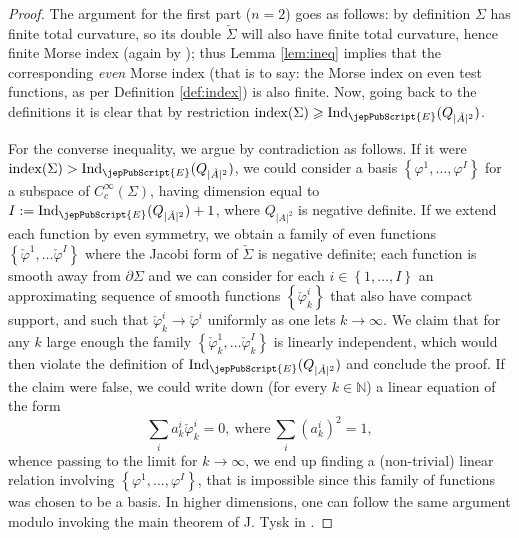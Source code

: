            \begin{proof}
        	The argument for the first part ($n=2$) goes as follows: by definition $\Sigma$ has finite total curvature, so its double $\check{\Sigma}$ will also have finite total curvature, hence finite Morse index (again by \cite{FC85}); thus Lemma \ref{lem:ineq} implies that the corresponding \textsl{even} Morse index (that is to say: the Morse index on even test functions, as per Definition \ref{def:index}) is also finite. Now, going back to the definitions it is clear that by restriction $\operatorname{index} (\Sigma)\geqslant \operatorname{Ind}_{{\jepPubScript{E}}}(Q_{|\check{A}|^2})$.
        	
        	For the converse inequality, we argue by contradiction as follows. If it were $\operatorname{index} (\Sigma)> \operatorname{Ind}_{{\jepPubScript{E}}}(Q_{|\check{A}|^2})$, we could consider a basis $\left\{\varphi^1,\ldots, \varphi^I\right\}$ for a subspace of $C^{\infty}_c(\Sigma)$, having dimension equal to $I:=\operatorname{Ind}_{{\jepPubScript{E}}}(Q_{|\check{A}|^2})+1$, where $Q_{|A|^2}$ is negative definite. 
        			If we extend each function by even symmetry, we obtain a family of even functions $\left\{\check{\varphi}^1,\ldots \check{\varphi}^I\right\}$ where the Jacobi form of $\check{\Sigma}$ is negative definite; each function is smooth away from $\partial\Sigma$  and we can consider for each $i\in\left\{1,\ldots, I\right\}$ an approximating sequence of smooth functions $\left\{\check{\varphi}^i_k\right\}$ that also have compact support, and such that $\check{\varphi}^i_k\to\check{\varphi}^i$ uniformly as one lets $k\to\infty$.
        	 		 We claim that for any $k$ large enough the family $\left\{\check{\varphi}^1_k,\ldots \check{\varphi}^I_k\right\}$ is linearly independent, which would then violate the definition of $\operatorname{Ind}_{{\jepPubScript{E}}}(Q_{|\check{A}|^2})$ and conclude the proof.
        			 If the claim were false, we could write down (for every $k\in\mathbb{N}$) a linear equation of the form
        		 \[
        		 \sum_i a^i_k \check{\varphi}^i_k=0, \ \text{where} \ \sum_i (a^i_k)^2=1,
        		 \]
        		whence passing to the limit for $k\to\infty$, we end up finding a (non-trivial) linear relation involving 
        	$\left\{\varphi^1,\ldots, \varphi^I\right\}$, that is impossible since this family of functions was chosen to be a basis.
        	 In higher dimensions, one can follow the same argument modulo invoking the main theorem of J. Tysk in \cite{T89}.
        	\end{proof}
       
